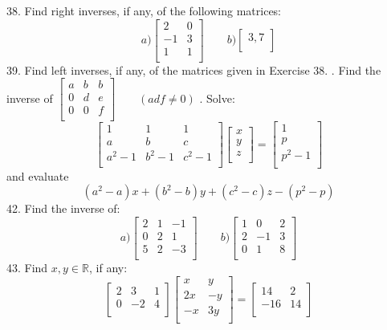 \documentclass[11pt]{amsbook}
\begin{document}
38. Find right inverses, if any, of the following matrices:
\[
a) 
 \begin{bmatrix}
    2  & 0 \\
    -1  & 3  \\
    1  & 1  \\
\end{bmatrix}
\qquad b) 
 \begin{bmatrix}
    3, 7 \\
\end{bmatrix}
\]
39. Find left inverses, if any, of the matrices given in Exercise 38. . Find the inverse of $
 \begin{bmatrix}
    a  & b &  b \\
    0  & d &  e \\
    0  & 0 &  f \\
\end{bmatrix}
\qquad (adf \neq 0)
$ . Solve:
\[
 \begin{bmatrix}
    1  & 1 &  1 \\
    a  & b &  c \\
    a^2-1  & b^2-1 &  c^2-1 \\
\end{bmatrix} 
 \begin{bmatrix}
    x  \\
    y  \\
    z  \\
\end{bmatrix}
=
\begin{bmatrix}
    1  \\
    p  \\
    p^2-1  \\
\end{bmatrix}
\]
and evaluate
\[
(a^2-a)x+(b^2-b)y+(c^2-c)z-(p^2-p)
\]
42. Find the inverse of:
\[
a) 
 \begin{bmatrix}
    2  & 1 &  -1 \\
    0  & 2 &  1  \\
    5  & 2 &  -3 \\
\end{bmatrix}
\qquad b) 
 \begin{bmatrix}
   1  & 0 &  2 \\
    2  & -1 &  3 \\
    0  & 1 &  8 \\
\end{bmatrix}
\]
43. Find $x, y\in \mathbb{R}$, if any:
\[
 \begin{bmatrix}
    2  & 3 &  1 \\
    0  & -2 &  4 \\
\end{bmatrix} 
 \begin{bmatrix}
    x  & y \\
    2x & -y  \\
    -x & 3y  \\
\end{bmatrix}
=
\begin{bmatrix}
    14 & 2  \\
    -16 & 14  \\
\end{bmatrix}
\]
\end{document}
